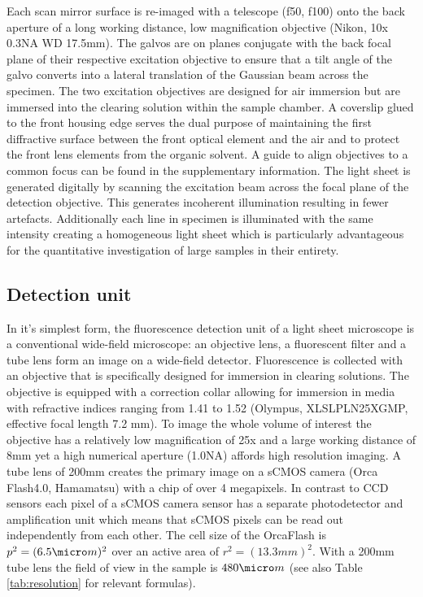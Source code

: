 \documentclass[12pt]{spieman}  %
\begin{document}
Each scan mirror surface is re-imaged with a telescope (f50, f100) onto the back aperture of a long working distance, low magnification objective (Nikon, 10x 0.3NA WD 17.5mm).  The galvos are on planes conjugate with the back focal plane of their respective excitation objective to ensure that a tilt angle of the galvo converts into a lateral translation of the Gaussian beam across the specimen. The two excitation objectives are designed for air immersion but are immersed into the clearing solution within the sample chamber. A coverslip glued to the front housing edge serves the dual purpose of maintaining the first diffractive surface between the front optical element and the air and to protect the front lens elements from the organic solvent. A guide to align objectives to a common focus can be found in the supplementary information. The light sheet is generated digitally\cite{Keller2008a,Keller2008b} by scanning the excitation beam across the focal plane of the detection objective. This generates incoherent illumination resulting in fewer artefacts. %
Additionally each line in specimen is illuminated with the same intensity creating a homogeneous light sheet which is particularly advantageous for the quantitative investigation of large samples in their entirety.

\subsection{Detection unit}
			
In it's simplest form, the fluorescence detection unit of a light sheet microscope is a conventional wide-field microscope: an objective lens, a fluorescent filter and a tube lens form an image on a wide-field detector. Fluorescence is collected with an objective that is specifically designed for immersion in clearing solutions. The objective is equipped with a correction collar allowing for immersion in media with refractive indices ranging from 1.41 to 1.52 (Olympus, XLSLPLN25XGMP, effective focal length 7.2 mm). To image the whole volume of interest the objective has a relatively low magnification of 25x and a large working distance of 8mm yet a high numerical aperture (1.0NA) affords high resolution imaging. A tube lens of 200mm creates the primary image on a sCMOS camera (Orca Flash4.0, Hamamatsu) with a chip of over 4 megapixels. In contrast to CCD sensors each pixel of a sCMOS camera sensor has a separate photodetector and amplification unit which means that sCMOS pixels can be read out independently from each other. The cell size of the OrcaFlash is $p^2= (6.5\micro m)^2$ over an active area of $r^2= (13.3mm)^2$. With a 200mm tube lens the field of view in the sample is $480\micro m$ (see also Table \ref{tab:resolution} for relevant formulas). 
\end{document}
